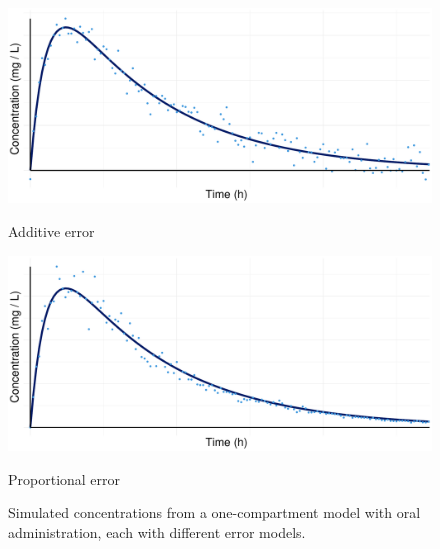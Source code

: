 \begin{figure}[h]
    \centering
    \begin{minipage}{0.45\textwidth}
        \centering
        \includegraphics[width=\linewidth]{fig/img/Residual Variance Model/Concentration W. Oral Add.pdf}
        \caption{Additive error}
        \label{fig: Residual variance model add}
    \end{minipage}%
    \hfill
    \begin{minipage}{0.45\textwidth}
        \centering
        \includegraphics[width=\linewidth]{fig/img/Residual Variance Model/Concentration W. Oral Prop.pdf}
        \caption{Proportional error}
        \label{fig: Residual variance model prop}
    \end{minipage}
    \caption{Simulated concentrations from a one-compartment model with oral administration, each with different error models.}
    \label{fig: Residual variance model}
\end{figure}

